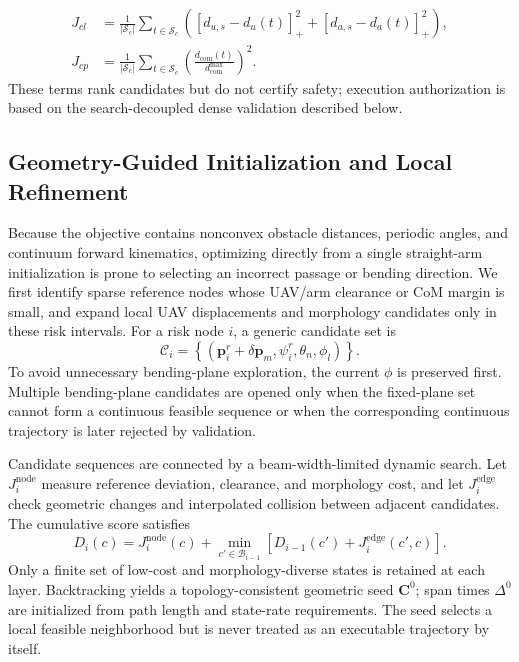 \documentclass[journal,twoside]{IEEEtran}
\begin{document}
\begin{equation}
\begin{aligned}
J_{cl}&=\frac{1}{|\mathcal S_c|}\sum_{t\in\mathcal S_c}
\left([d_{u,s}-d_u(t)]_+^2+[d_{a,s}-d_a(t)]_+^2\right),\\
J_{cp}&=\frac{1}{|\mathcal S_c|}\sum_{t\in\mathcal S_c}
\left(\frac{d_{\mathrm{com}}(t)}{d_{\mathrm{com}}^{\max}}\right)^2.
\end{aligned}
\label{eq:soft_terms}
\end{equation}
These terms rank candidates but do not certify safety; execution authorization is based on the search-decoupled dense validation described below.

\subsection{Geometry-Guided Initialization and Local Refinement}
Because the objective contains nonconvex obstacle distances, periodic angles, and continuum forward kinematics, optimizing directly from a single straight-arm initialization is prone to selecting an incorrect passage or bending direction. We first identify sparse reference nodes whose UAV/arm clearance or CoM margin is small, and expand local UAV displacements and morphology candidates only in these risk intervals. For a risk node $i$, a generic candidate set is
\begin{equation}
\mathcal C_i=
\left\{(\mathbf p_i^r+\delta\mathbf p_m,\psi_i^r,\theta_n,\phi_l)\right\}.
\label{eq:candidate_set}
\end{equation}
To avoid unnecessary bending-plane exploration, the current $\phi$ is preserved first. Multiple bending-plane candidates are opened only when the fixed-plane set cannot form a continuous feasible sequence or when the corresponding continuous trajectory is later rejected by validation.

Candidate sequences are connected by a beam-width-limited dynamic search. Let $J_i^{\mathrm{node}}$ measure reference deviation, clearance, and morphology cost, and let $J_i^{\mathrm{edge}}$ check geometric changes and interpolated collision between adjacent candidates. The cumulative score satisfies
\begin{equation}
D_i(c)=J_i^{\mathrm{node}}(c)+
\min_{c'\in\mathcal B_{i-1}}
\left[D_{i-1}(c')+J_i^{\mathrm{edge}}(c',c)\right].
\label{eq:beam_search}
\end{equation}
Only a finite set of low-cost and morphology-diverse states is retained at each layer. Backtracking yields a topology-consistent geometric seed $\mathbf C^0$; span times $\Delta^0$ are initialized from path length and state-rate requirements. The seed selects a local feasible neighborhood but is never treated as an executable trajectory by itself.
\end{document}
